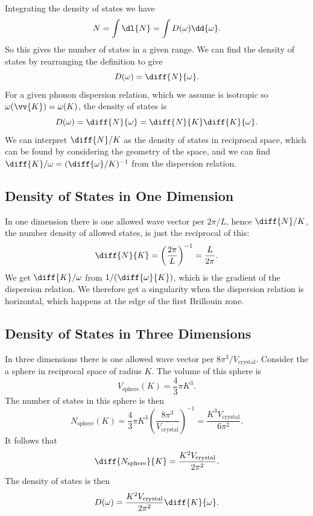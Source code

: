 \documentclass[fleqn]{NotesClass}
\begin{document}
    Integrating the density of states we have
    \begin{equation}
        N = \int\dl{N} = \int D(\omega) \dd{\omega}.
    \end{equation}
    So this gives the number of states in a given range.
    We can find the density of states by rearranging the definition to give
    \begin{equation}
        D(\omega) = \diff{N}{\omega}.
    \end{equation}
    For a given phonon dispersion relation, which we assume is isotropic so \(\omega(\vv{K}) = \omega(K)\), the density of states is
    \begin{equation}
        D(\omega) = \diff{N}{\omega} = \diff{N}{K} \diff{K}{\omega}.
    \end{equation}
    We can interpret \(\diff{N}/{K}\) as the density of states in reciprocal space, which can be found by considering the geometry of the space, and we can find \(\diff{K}/{\omega} = (\diff{\omega}/{K})^{-1}\) from the dispersion relation.
    
    \subsection{Density of States in One Dimension}
    In one dimension there is one allowed wave vector per \(2\pi/L\), hence \(\diff{N}/{K}\), the number density of allowed states, is just the reciprocal of this:
    \begin{equation}
        \diff{N}{K} = \left( \frac{2\pi}{L} \right)^{-1} = \frac{L}{2\pi}.
    \end{equation}
    We get \(\diff{K}/{\omega}\) from \(1/(\diff{\omega}{K})\), which is the gradient of the dispersion relation.
    We therefore get a singularity when the dispersion relation is horizontal, which happens at the edge of the first Brillouin zone.
    
    \subsection{Density of States in Three Dimensions}
    In three dimensions there is one allowed wave vector per \(8\pi^3/V_{\mathrm{crystal}}\).
    Consider the a sphere in reciprocal space of radius \(K\).
    The volume of this sphere is
    \begin{equation}
        V_{\mathrm{sphere}}(K) = \frac{4}{3}\pi K^3.
    \end{equation}
    The number of states in this sphere is then
    \begin{equation}
        N_{\mathrm{sphere}}(K) = \frac{4}{3}\pi K^3 \left( \frac{8\pi^3}{V_{\mathrm{crystal}}} \right)^{-1} = \frac{K^3V_{\mathrm{crystal}}}{6\pi^2}.
    \end{equation}
    It follows that
    \begin{equation}
        \diff{N_{\mathrm{sphere}}}{K} = \frac{K^2V_{\mathrm{crystal}}}{2\pi^2}.
    \end{equation}
    The density of states is then
    \begin{equation}
        D(\omega) = \frac{K^2V_{\mathrm{crystal}}}{2\pi^2} \diff{K}{\omega}.
    \end{equation}
    
\end{document}

